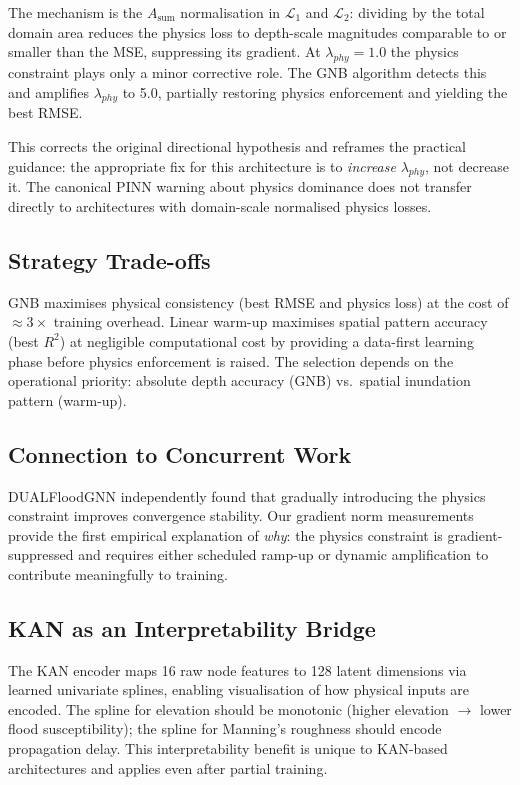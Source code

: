 \documentclass[conference]{IEEEtran}
\begin{document}
The mechanism is the $A_{\text{sum}}$ normalisation in $\mathcal{L}_1$ and
$\mathcal{L}_2$: dividing by the total domain area reduces the physics loss
to depth-scale magnitudes comparable to or smaller than the MSE, suppressing
its gradient. At $\lambda_{phy}=1.0$ the physics constraint plays only a
minor corrective role. The GNB algorithm detects this and amplifies
$\lambda_{phy}$ to 5.0, partially restoring physics enforcement and yielding
the best RMSE.

This corrects the original directional hypothesis and reframes the
practical guidance: the appropriate fix for this architecture is to
\emph{increase} $\lambda_{phy}$, not decrease it. The canonical PINN
warning about physics dominance does not transfer directly to architectures
with domain-scale normalised physics losses.

\subsection{Strategy Trade-offs}

GNB maximises physical consistency (best RMSE and physics loss) at the
cost of ${\approx}3\times$ training overhead. Linear warm-up maximises
spatial pattern accuracy (best $R^2$) at negligible computational cost by
providing a data-first learning phase before physics enforcement is raised.
The selection depends on the operational priority: absolute depth accuracy
(GNB) vs.\ spatial inundation pattern (warm-up).

\subsection{Connection to Concurrent Work}
DUALFloodGNN \cite{acosta2025} independently found that gradually
introducing the physics constraint improves convergence stability. Our
gradient norm measurements provide the first empirical explanation of
\emph{why}: the physics constraint is gradient-suppressed and requires
either scheduled ramp-up or dynamic amplification to contribute
meaningfully to training.

\subsection{KAN as an Interpretability Bridge}
The KAN encoder maps 16 raw node features to 128 latent dimensions via
learned univariate splines, enabling visualisation of how physical inputs
are encoded. The spline for elevation should be monotonic (higher elevation
$\to$ lower flood susceptibility); the spline for Manning's roughness should
encode propagation delay. This interpretability benefit is unique to
KAN-based architectures and applies even after partial training.
\end{document}
